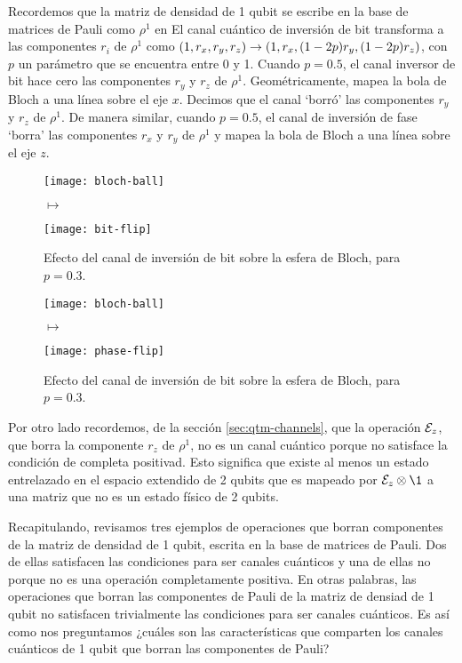 Recordemos que la matriz de densidad de 1 qubit
se escribe en la base de matrices de Pauli
como $\rho^1$ en %
El canal cuántico de inversión de bit transforma a las componentes 
$r_i$ de $\rho^1$ como $(1,r_x,r_y,r_z)\to\qty(1,r_x,(1-2p)r_y,(1-2p)r_z)$, 
con $p$ un parámetro que se encuentra entre 0 y 1.
Cuando $p=0.5$, el canal inversor de bit hace cero las 
componentes $r_y$ y $r_z$ de $\rho^1$. Geométricamente,
mapea la bola de Bloch a una línea sobre el eje $x$.
Decimos que el canal `borró' las componentes $r_y$ y $r_z$ de $\rho^1$. 
De manera similar, cuando $p=0.5$, el canal 
de inversión de fase `borra' las componentes $r_x$ y $r_y$
de $\rho^1$ y mapea la bola de Bloch a una línea sobre el eje $z$.

\begin{figure}
\centering
\begin{minipage}{.4\textwidth}
    \centering
    \texttt{[image: bloch-ball]}
\end{minipage}
$\longmapsto$
\begin{minipage}{0.4\textwidth}
    \centering
    \texttt{[image: bit-flip]}
\end{minipage}
\caption{
Efecto del canal de inversión de bit sobre la esfera de Bloch, para $p=0.3$.}
\label{fig:bit-flip}
\end{figure}

\begin{figure}
\centering
\begin{minipage}{.4\textwidth}
    \centering
    \texttt{[image: bloch-ball]}
\end{minipage}
$\longmapsto$
\begin{minipage}{0.4\textwidth}
    \centering
    \texttt{[image: phase-flip]}
\end{minipage}
\caption{
Efecto del canal de inversión de bit sobre la esfera de Bloch, para $p=0.3$.}
\label{fig:phase-flip}
\end{figure}

Por otro lado recordemos, de la sección \ref{sec:qtm-channels}, 
que la operación $\mathcal{E}_z$, que borra la componente $r_z$ de $\rho^1$,
no es un canal cuántico porque no satisface la condición de completa
positivad. Esto significa que existe al menos un estado entrelazado en 
el espacio extendido de 2 qubits que es mapeado por $\E_z\otimes \1$ 
a una matriz que no es un estado físico de 2 qubits. 

Recapitulando, revisamos tres ejemplos de operaciones que borran 
componentes de la matriz de densidad de 1 qubit, escrita en la base 
de matrices de Pauli. Dos de ellas satisfacen las condiciones para 
ser canales cuánticos y una de ellas no porque no es una operación 
completamente positiva. En otras palabras, las operaciones que 
borran las componentes de Pauli de la matriz de densiad de 1 qubit 
no satisfacen trivialmente las condiciones para ser canales cuánticos.
Es así como nos preguntamos ¿cuáles son las características que
comparten los canales cuánticos de 1 qubit que borran las componentes 
de Pauli? 

